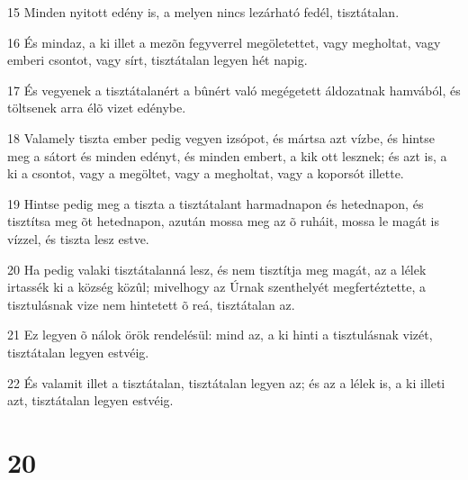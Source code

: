 \par 15 Minden nyitott edény is, a melyen nincs lezárható fedél, tisztátalan.
\par 16 És mindaz, a ki illet a mezõn fegyverrel megöletettet, vagy megholtat, vagy emberi csontot, vagy sírt, tisztátalan legyen hét napig.
\par 17 És vegyenek a tisztátalanért a bûnért való megégetett áldozatnak hamvából, és töltsenek arra élõ vizet edénybe.
\par 18 Valamely tiszta ember pedig vegyen izsópot, és mártsa azt vízbe, és hintse meg a sátort és minden edényt, és minden embert, a kik ott lesznek; és azt is, a ki a csontot, vagy a megöltet, vagy a megholtat, vagy a koporsót illette.
\par 19 Hintse pedig meg a tiszta a tisztátalant harmadnapon és hetednapon, és tisztítsa meg õt hetednapon, azután mossa meg az õ ruháit, mossa le magát is vízzel, és tiszta lesz estve.
\par 20 Ha pedig valaki tisztátalanná lesz, és nem tisztítja meg magát, az a lélek irtassék ki a község közûl; mivelhogy az Úrnak szenthelyét megfertéztette, a tisztulásnak vize nem hintetett õ reá, tisztátalan az.
\par 21 Ez legyen õ nálok örök rendelésül: mind az, a ki hinti a tisztulásnak vizét, tisztátalan legyen estvéig.
\par 22 És valamit illet a tisztátalan, tisztátalan legyen az; és az a lélek is, a ki illeti azt, tisztátalan legyen estvéig.

\chapter{20}

